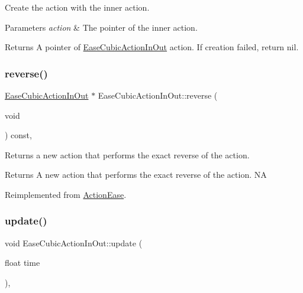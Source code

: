 Create the action with the inner action. 


\begin{DoxyParams}{Parameters}
{\em action} & The pointer of the inner action. \\
\hline
\end{DoxyParams}
\begin{DoxyReturn}{Returns}
A pointer of \hyperlink{classEaseCubicActionInOut}{Ease\+Cubic\+Action\+In\+Out} action. If creation failed, return nil. 
\end{DoxyReturn}
\mbox{\label{classEaseCubicActionInOut_a3a63b33ec9a062bd76116f17dd2eb8b4}} 
\subsubsection{\texorpdfstring{reverse()}{reverse()}}
{\footnotesize\ttfamily \hyperlink{classEaseCubicActionInOut}{Ease\+Cubic\+Action\+In\+Out} $\ast$ Ease\+Cubic\+Action\+In\+Out\+::reverse (\begin{DoxyParamCaption}\item[{void}]{ }\end{DoxyParamCaption}) const\hspace{0.3cm}{\ttfamily [override]}, {\ttfamily [virtual]}}

Returns a new action that performs the exact reverse of the action.

\begin{DoxyReturn}{Returns}
A new action that performs the exact reverse of the action.  NA 
\end{DoxyReturn}


Reimplemented from \hyperlink{classActionEase_ab99eb083fa033fae1d6c948fdc730782}{Action\+Ease}.

\mbox{\label{classEaseCubicActionInOut_a533edabe94657e779ad4e4c6d6d1782f}} 
\subsubsection{\texorpdfstring{update()}{update()}}
{\footnotesize\ttfamily void Ease\+Cubic\+Action\+In\+Out\+::update (\begin{DoxyParamCaption}\item[{float}]{time }\end{DoxyParamCaption})\hspace{0.3cm}{\ttfamily [override]}, {\ttfamily [virtual]}}

